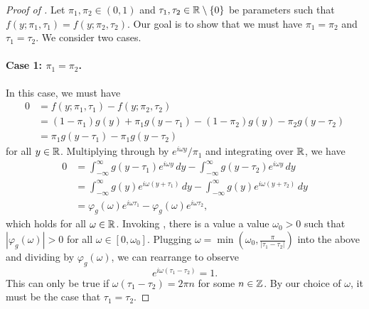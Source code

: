 \begin{proof}[Proof of ]
Let $\pi_1, \pi_2 \in (0,1)$ and $\tau_1, \tau_2 \in \mathbb{R} \setminus \{ 0 \}$ be parameters such that $f(y;\pi_1, \tau_1) = f(y;\pi_2, \tau_2)$. Our goal is to show that we must have $\pi_1 = \pi_2$ and $\tau_1 = \tau_2$. We consider two cases.


\paragraph{Case 1: $\pi_1 = \pi_2$.} In this case, we must have
\begin{align*}
0 &= f(y;\pi_1, \tau_1) - f(y;\pi_2, \tau_2) \\
&= (1- \pi_1) g(y) + \pi_1 g(y-\tau_1) - (1- \pi_2) g(y) - \pi_2 g(y-\tau_2) \\
&= \pi_1 g(y-\tau_1) - \pi_1 g(y - \tau_2)
\end{align*}
for all $y \in \mathbb{R}$. Multiplying through by $e^{i \omega y}/\pi_1$ and integrating over $\mathbb{R}$, we have
\begin{align*}
0 &= \int_{-\infty}^\infty g(y-\tau_1) e^{i \omega y} \, dy - \int_{-\infty}^\infty g(y-\tau_2) e^{i \omega y} \, dy \\
&= \int_{-\infty}^\infty g(y) e^{i \omega (y+\tau_1)} \, dy - \int_{-\infty}^\infty g(y) e^{i \omega (y+\tau_2)} \, dy \\
&= \varphi_g(\omega) e^{i\omega \tau_1} - \varphi_g(\omega) e^{i\omega \tau_2},
\end{align*}
which holds for all $\omega \in \mathbb{R}$. Invoking , there is a value a value $\omega_0 > 0$ such that $|\varphi_g(\omega)| > 0$ for all $\omega \in [0, \omega_0]$. Plugging $\omega = \min \left( \omega_0, \frac{\pi}{|\tau_1 - \tau_2|}\right)$ into the above and dividing by $\varphi_g(\omega)$, we can rearrange to observe
\[ e^{i \omega (\tau_1 - \tau_2)} = 1. \]
This can only be true if $\omega (\tau_1 - \tau_2) = 2 \pi n$ for some $n \in \mathbb{Z}$. By our choice of $\omega$, it must be the case that $\tau_1 = \tau_2$.


\end{proof}

